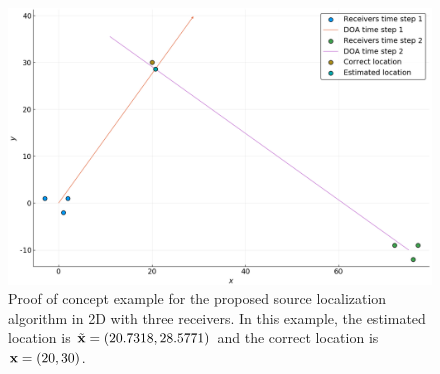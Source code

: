 \begin{figure}[H]
  \includegraphics[scale=0.4]{DOA_proofofconcept}
  \caption{Proof of concept example for the proposed source localization algorithm in 2D with three receivers. In this example, the estimated location is $\tilde{\mathbf{x}} = (20.7318,28.5771)$ and the correct location is $\mathbf{x} = (20,30)$.}
  \label{fig:doa}
\end{figure}
